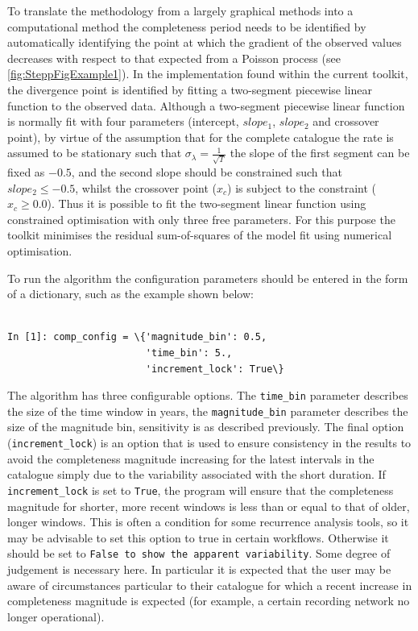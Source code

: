 To translate the methodology from a largely graphical methods into a computational method the completeness period needs to be identified by automatically identifying the point at which the gradient of the observed values decreases with respect to that expected from a Poisson process (see \ref{fig:SteppFigExample1}). In the implementation found within the current toolkit, the divergence point is identified by fitting a two-segment piecewise linear function to the observed data. Although a two-segment piecewise linear function is normally fit with four parameters (intercept, $slope_1$, $slope_2$ and crossover point), by virtue of the assumption that for the complete catalogue the rate is assumed to be stationary such that $\sigma_{\lambda} = \frac{1}{\sqrt{T}}$ the slope of the first segment can be fixed as $-0.5$, and the second slope should be constrained such that $slope_2 \leq -0.5$, whilst the crossover point ($x_c$) is subject to the constraint ($x_c \geq 0.0$). Thus it is possible to fit the two-segment linear function using constrained optimisation with only three free parameters. For this purpose the toolkit minimises the residual sum-of-squares of the model fit using numerical optimisation. 

To run the \cite{Stepp1971} algorithm the configuration parameters should be entered in the form of a dictionary, such as the example shown below:

\begin{Verbatim}[frame=single, commandchars=\\\{\}, fontsize=\scriptsize, samepage=true]

In [1]: comp_config = \{'magnitude_bin': 0.5,
                        'time_bin': 5.,
                        'increment_lock': True\}

\end{Verbatim}

The algorithm has three configurable options. The \verb=time_bin= parameter describes the size of the time window in years, the \verb=magnitude_bin= parameter describes the size of the magnitude bin, sensitivity is as described previously. The final option (\verb=increment_lock=) is an option that is used to ensure consistency in the results to avoid the completeness magnitude increasing for the latest intervals in the catalogue simply due to the variability associated with the short duration. If \verb=increment_lock= is set to \verb=True=, the program will ensure that the completeness magnitude for shorter, more recent windows is less than or equal to that of older, longer windows. This is often a condition for some recurrence analysis tools, so it may be advisable to set this option to true in certain workflows. Otherwise it should be set to \verb=False to show the apparent variability=. Some degree of judgement is necessary here. In particular it is expected that the user may be aware of circumstances particular to their catalogue for which a recent increase in completeness magnitude is expected (for example, a certain recording network no longer operational).  


